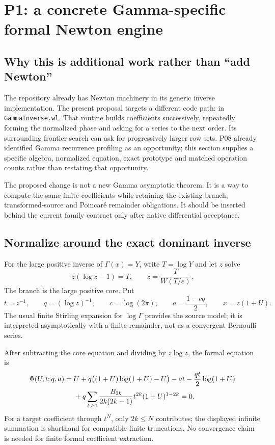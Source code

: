\documentclass[11pt,letterpaper]{article}
\newcommand{\code}[1]{\texttt{\detokenize{#1}}}
\newcommand{\pathcode}[1]{\nolinkurl{#1}}
\begin{document}
\section{P1: a concrete Gamma-specific formal Newton engine}
\subsection{Why this is additional work rather than ``add Newton''}
The repository already has Newton machinery in its generic inverse implementation. The present proposal targets a different code path: \code{gammaInverseUnit} in \pathcode{GammaInverse.wl}. That routine builds coefficients successively, repeatedly forming the normalized phase and asking for a series to the next order. Its surrounding frontier search can ask for progressively larger row sets. P08 already identified Gamma recurrence profiling as an opportunity; this section supplies a specific algebra, normalized equation, exact prototype and matched operation counts rather than restating that opportunity.\cite{gamma,register}

The proposed change is not a new Gamma asymptotic theorem. It is a way to compute the same finite coefficients while retaining the existing branch, transformed-source and Poincar\'e remainder obligations. It should be inserted behind the current family contract only after native differential acceptance.

\subsection{Normalize around the exact dominant inverse}
For the large positive inverse of $\Gamma(x)=Y$, write $T=\log Y$ and let $z$ solve
\[
 z(\log z-1)=T,
 \qquad z=\frac{T}{W(T/e)}.
\]
The branch is the large positive core. Put
\[
 t=z^{-1},\qquad q=(\log z)^{-1},\qquad
 c=\log(2\pi),\qquad a=\frac{1-cq}{2},\qquad x=z(1+U).
\]
The usual finite Stirling expansion for $\log\Gamma$ provides the source model; it is interpreted asymptotically with a finite remainder, not as a convergent Bernoulli series.\cite{dlmfgamma}

After subtracting the core equation and dividing by $z\log z$, the formal equation is
\begin{align}
\Phi(U,t;q,a)={}&U+q\bigl((1+U)\log(1+U)-U\bigr)-at
 -\frac{qt}{2}\log(1+U) \notag\\
 &+q\sum_{k\ge1}\frac{B_{2k}}{2k(2k-1)}
       t^{2k}(1+U)^{1-2k}=0.
\label{eq:gamma-phase}
\end{align}
For a target coefficient through $t^N$, only $2k\le N$ contributes; the displayed infinite summation is shorthand for compatible finite truncations. No convergence claim is needed for finite formal coefficient extraction.
\end{document}
